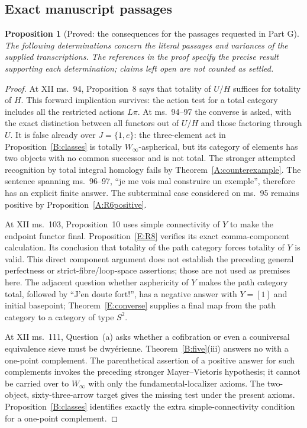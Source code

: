 \documentclass[11pt,a4paper]{article}
\newtheorem{proposition}[theorem]{Proposition}
\theoremstyle{definition}
\theoremstyle{remark}
\newcommand{\Winfty}{W_\infty}
\begin{document}
\subsection{Exact manuscript passages}

\begin{proposition}[Proved: the consequences for the passages requested in Part G]\label{G:passages}
The following determinations concern the literal passages and variances of the supplied transcriptions. The references in the proof specify the precise result supporting each determination; claims left open are not counted as settled.
\end{proposition}
\begin{proof}
At XII ms.~94, Proposition~8 says that totality of $U/H$ suffices for totality of $H$. This forward implication survives: the action test for a total category includes all the restricted actions $L\pi$. At ms.~94--97 the converse is asked, with the exact distinction between all functors out of $U/H$ and those factoring through $U$. It is false already over $J=\{1,e\}$: the three-element act in Proposition~\ref{B:classes} is totally $\Winfty$-aspherical, but its category of elements has two objects with no common successor and is not total. The stronger attempted recognition by total integral homology fails by Theorem~\ref{A:counterexample}. The sentence spanning ms.~96--97, ``je me vois mal construire un exemple'', therefore has an explicit finite answer. The subterminal case considered on ms.~95 remains positive by Proposition~\ref{A:R6positive}.

At XII ms.~103, Proposition~10 uses simple connectivity of $Y$ to make the endpoint functor final. Proposition~\ref{E:R8} verifies its exact comma-component calculation. Its conclusion that totality of the path category forces totality of $Y$ is valid. This direct component argument does not establish the preceding general perfectness or strict-fibre/loop-space assertions; those are not used as premises here. The adjacent question whether asphericity of $Y$ makes the path category total, followed by ``J'en doute fort!'', has a negative answer with $Y=[1]$ and initial basepoint; Theorem~\ref{E:converse} supplies a final map from the path category to a category of type $S^2$.

At XII ms.~111, Question~(a) asks whether a cofibration or even a couniversal equivalence sieve must be dwy\'erienne. Theorem~\ref{B:five}(iii) answers no with a one-point complement. The parenthetical assertion of a positive answer for such complements invokes the preceding stronger Mayer--Vietoris hypothesis; it cannot be carried over to $\Winfty$ with only the fundamental-localizer axioms. The two-object, sixty-three-arrow target gives the missing test under the present axioms. Proposition~\ref{B:classes} identifies exactly the extra simple-connectivity condition for a one-point complement.


\end{proof}
\end{document}
